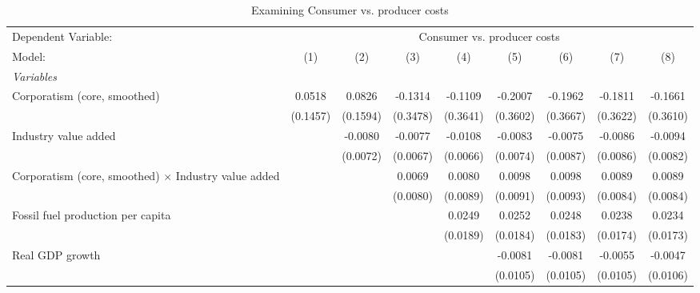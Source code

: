 
\begin{table}[htbp]
   \caption{Examining Consumer vs. producer costs}
   \centering
   \begin{tabular}{lcccccccc}
      \tabularnewline \midrule \midrule
      Dependent Variable: & \multicolumn{8}{c}{Consumer vs. producer costs}\\
      Model:                                                      & (1)      & (2)      & (3)      & (4)      & (5)      & (6)      & (7)      & (8)\\  
      \midrule
      \emph{Variables}\\
      Corporatism (core, smoothed)                                & 0.0518   & 0.0826   & -0.1314  & -0.1109  & -0.2007  & -0.1962  & -0.1811  & -0.1661\\   
                                                                  & (0.1457) & (0.1594) & (0.3478) & (0.3641) & (0.3602) & (0.3667) & (0.3622) & (0.3610)\\   
      Industry value added                                        &          & -0.0080  & -0.0077  & -0.0108  & -0.0083  & -0.0075  & -0.0086  & -0.0094\\   
                                                                  &          & (0.0072) & (0.0067) & (0.0066) & (0.0074) & (0.0087) & (0.0086) & (0.0082)\\   
      Corporatism (core, smoothed) $\times$ Industry value added  &          &          & 0.0069   & 0.0080   & 0.0098   & 0.0098   & 0.0089   & 0.0089\\   
                                                                  &          &          & (0.0080) & (0.0089) & (0.0091) & (0.0093) & (0.0084) & (0.0084)\\   
      Fossil fuel production per capita                           &          &          &          & 0.0249   & 0.0252   & 0.0248   & 0.0238   & 0.0234\\   
                                                                  &          &          &          & (0.0189) & (0.0184) & (0.0183) & (0.0174) & (0.0173)\\   
      Real GDP growth                                             &          &          &          &          & -0.0081  & -0.0081  & -0.0055  & -0.0047\\   
                                                                  &          &          &          &          & (0.0105) & (0.0105) & (0.0105) & (0.0106)\\   

\end{tabular}
\end{table}
